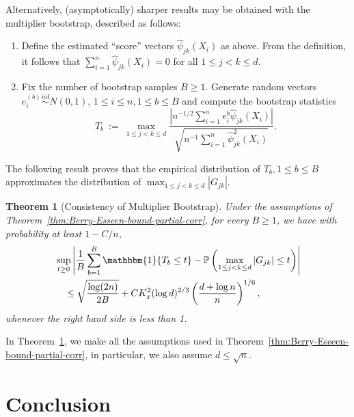 \documentclass[11pt]{article}
\let\tilde\widetilde
\newtheorem{theorem}{Theorem}
\begin{document}
Alternatively, (asymptotically) sharper results may be obtained with the multiplier bootstrap, described as follows:
\begin{enumerate}
\item Define the estimated ``score'' vectors $\widehat{\psi}_{jk}(X_i)$ as above. From the definition, it follows that $\sum_{i=1}^n \widehat{\psi}_{jk}(X_i) = 0$ for all $1\le j < k\le d$.
\item Fix the number of bootstrap samples $B \ge 1$. Generate random vectors $e_i^{(b)}\overset{iid}{\sim}N(0, 1)$, $1\le i\le n, 1\le b\le B$ and compute the bootstrap statistics
\[
T_b ~:=~ \max_{1\le j < k\le d}\frac{|n^{-1/2}\sum_{i=1}^n e_i^{b}\widehat{\psi}_{jk}(X_i)|}{\sqrt{n^{-1}\sum_{i=1}^n \widehat{\psi}_{jk}^2(X_i)}}.
\]
\end{enumerate}
The following result proves that the empirical distribution of $T_b, 1\le b\le B$ approximates the distribution of $\max_{1\le j < k\le d}|G_{jk}|$.
\begin{theorem}[Consistency of Multiplier Bootstrap]\label{eq:multplier-bootstrap-consistency-partial-corr}
Under the assumptions of Theorem~\ref{thm:Berry-Esseen-bound-partial-corr}, for every $B\ge1$, we have with probability at least $1 - C/n$,
\begin{align*}
&\sup_{t\ge0}\left|\frac{1}{B}\sum_{b=1}^B \mathbbm{1}\{T_b \le t\} - \mathbb{P}\left(\max_{1\le j < k\le d}|G_{jk}| \le t\right)\right|\\ 
&\quad\le \sqrt{\frac{\log(2n)}{2B}} + CK_x^{2}(\log d)^{{2}/{3}}\left(\frac{d + \log n}{n}\right)^{{1}/{6}},
\end{align*}
whenever the right hand side is less than 1.
\end{theorem}
In Theorem~\ref{eq:multplier-bootstrap-consistency-partial-corr}, we make all the assumptions used in Theorem~\ref{thm:Berry-Esseen-bound-partial-corr}, in particular, we also assume $d \le \sqrt{n}$.





\section{Conclusion}
\label{section::conclusion}
\end{document}
